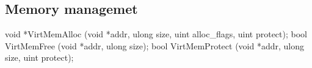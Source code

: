 \subsection{Memory managemet}
\label{sec:abi:memory}

\begin{paldef}
void *VirtMemAlloc (void *addr, ulong size,
                    uint alloc_flags, uint protect);
bool VirtMemFree (void *addr, ulong size);
bool VirtMemProtect (void *addr, ulong size, uint protect);
\end{paldef}






